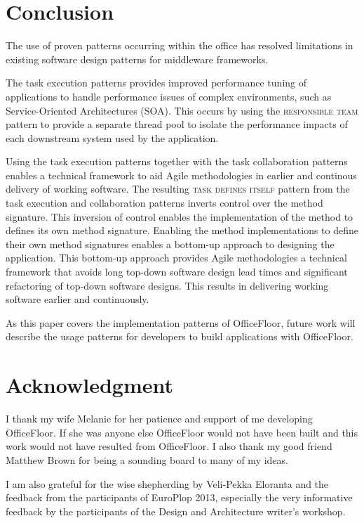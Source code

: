 \documentclass[prodmode]{style/acmlarge}
\begin{document}
\section{Conclusion}

The use of proven patterns occurring within the office has resolved limitations
in existing software design patterns for middleware frameworks.

The task execution patterns provides improved performance tuning of
applications to handle performance issues of complex environments, such as
Service-Oriented Architectures (SOA).  This occurs by using the
\textsc{responsible team} pattern to provide a separate thread pool to isolate
the performance impacts of each downstream system used by the application.

Using the task execution patterns together with the task collaboration patterns
enables a technical framework to aid Agile methodologies in earlier and
continous delivery of working software.  The resulting \textsc{task defines
itself} pattern from the task execution and collaboration patterns inverts
control over the method signature.  This inversion of control enables the
implementation of the method to defines its own method signature.  Enabling the
method implementations to define their own method signatures enables a bottom-up
approach to designing the application.  This bottom-up approach provides Agile
methodologies a technical framework that avoids long top-down software design
lead times and significant refactoring of top-down software designs.  This
results in delivering working software earlier and continuously.

As this paper covers the implementation patterns of OfficeFloor, future work
will describe the usage patterns for developers to build applications with
OfficeFloor.



\section*{Acknowledgment} 

I thank my wife Melanie for her patience and support of me developing
OfficeFloor.  If she was anyone else OfficeFloor would not have been built and
this work would not have resulted from OfficeFloor.  I also thank my good friend
Matthew Brown for being a sounding board to many of my ideas.

I am also grateful for the wise shepherding by Veli-Pekka Eloranta and the
feedback from the participants of EuroPlop 2013, especially the very informative
feedback by the participants of the Design and Architecture writer's workshop.




\end{document}
